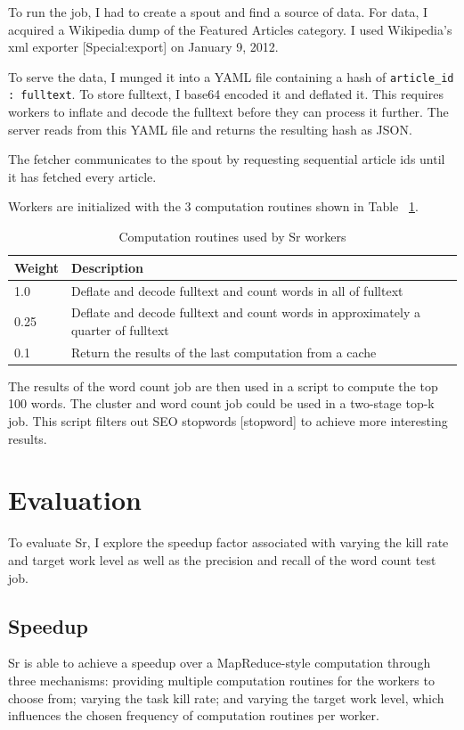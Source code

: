 \documentclass[12pt]{article}
\begin{document}
To run the job, I had to create a spout and find a source of data. For data, I acquired a Wikipedia dump of the Featured Articles category. I used Wikipedia’s xml exporter [Special:export] on January 9, 2012.

To serve the data, I munged it into a YAML file containing a hash of \lstinline[language=Ruby]{article_id : fulltext}. To store fulltext, I base64 encoded it and deflated it. This requires workers to inflate and decode the fulltext before they can process it further. The server reads from this YAML file and returns the resulting hash as JSON.

The fetcher communicates to the spout by requesting sequential article ids until it has fetched every article.

Workers are initialized with the 3 computation routines shown in Table ~\ref{table:workerTasks}.

\begin{table}
\begin{tabular}{|l|p{5cm}|}
 \hline
Weight & Description \\ \hline
1.0 & Deflate and decode fulltext and count words in all of fulltext \\ \hline
0.25 & Deflate and decode fulltext and count words in approximately a quarter of fulltext \\ \hline
0.1 & Return the results of the last computation from a cache \\ \hline
\end{tabular}
\caption{Computation routines used by Sr workers}
\label{table:workerTasks}
\end{table}

The results of the word count job are then used in a script to compute the top 100 words. The cluster and word count job could be used in a two-stage top-k job. This script filters out SEO stopwords [stopword] to achieve more interesting results.

\section{Evaluation}
To evaluate Sr, I explore the speedup factor associated with varying the kill rate and target work level as well as the precision and recall of the word count test job.
\subsection{Speedup}
Sr is able to achieve a speedup over a MapReduce-style computation through three mechanisms: providing multiple computation routines for the workers to choose from; varying the task kill rate; and varying the target work level, which influences the chosen frequency of computation routines per worker.
\end{document}
